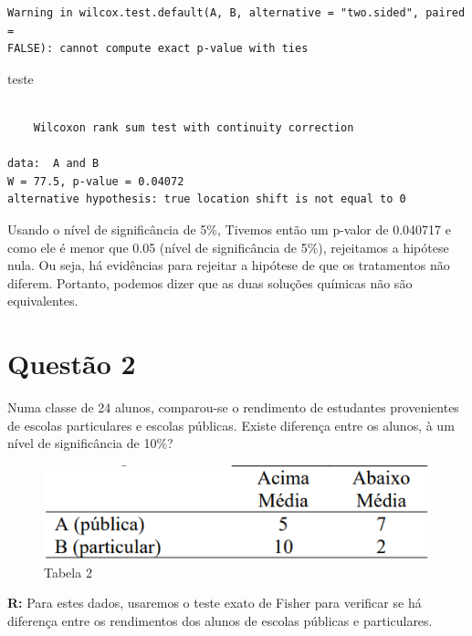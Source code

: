 \documentclass[
  letterpaper,
  DIV=11,
  numbers=noendperiod]{scrartcl}
\newenvironment{Shaded}{\begin{snugshade}}{\end{snugshade}}
\newcommand{\NormalTok}[1]{\textcolor[rgb]{0.00,0.23,0.31}{#1}}
\begin{document}
\begin{verbatim}
Warning in wilcox.test.default(A, B, alternative = "two.sided", paired =
FALSE): cannot compute exact p-value with ties
\end{verbatim}

\begin{Shaded}
\begin{Highlighting}[]
\NormalTok{teste}
\end{Highlighting}
\end{Shaded}

\begin{verbatim}

    Wilcoxon rank sum test with continuity correction

data:  A and B
W = 77.5, p-value = 0.04072
alternative hypothesis: true location shift is not equal to 0
\end{verbatim}

Usando o nível de significância de 5\%, Tivemos então um p-valor de
0.040717 e como ele é menor que 0.05 (nível de significância de 5\%),
rejeitamos a hipótese nula. Ou seja, há evidências para rejeitar a
hipótese de que os tratamentos não diferem. Portanto, podemos dizer que
as duas soluções químicas não são equivalentes.

\section{Questão 2}\label{questuxe3o-2}

Numa classe de 24 alunos, comparou-se o rendimento de estudantes
provenientes de escolas particulares e escolas públicas. Existe
diferença entre os alunos, à um nível de significância de 10\%?

\begin{figure}[H]

{\centering \includegraphics{imgs/q2-tabela.png}

}

\caption{Tabela 2}

\end{figure}%

\textbf{R:} Para estes dados, usaremos o teste exato de Fisher para
verificar se há diferença entre os rendimentos dos alunos de escolas
públicas e particulares.
\end{document}
